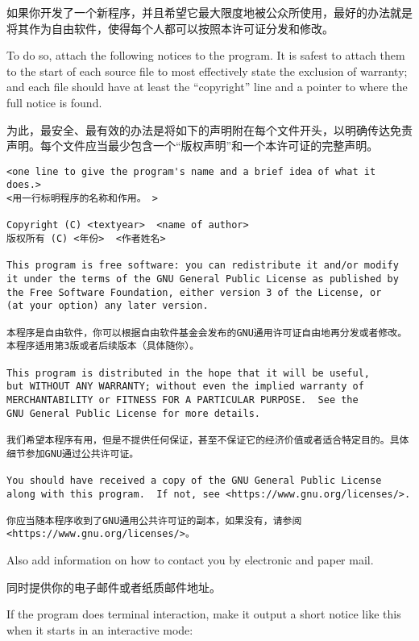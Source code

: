 \documentclass[11pt]{article}
\begin{document}
\begin{enumerate}
        如果你开发了一个新程序，并且希望它最大限度地被公众所使用，最好的办法就是将其作为自由软件，使得每个人都可以按照本许可证分发和修改。

        To do so, attach the following notices to the program.  It is safest
        to attach them to the start of each source file to most effectively
        state the exclusion of warranty; and each file should have at least
        the ``copyright'' line and a pointer to where the full notice is found.

        为此，最安全、最有效的办法是将如下的声明附在每个文件开头，以明确传达免责声明。每个文件应当最少包含一个“版权声明”和一个本许可证的完整声明。

          {\footnotesize
            \begin{verbatim}
<one line to give the program's name and a brief idea of what it does.>
<用一行标明程序的名称和作用。 >

Copyright (C) <textyear>  <name of author>
版权所有 (C) <年份>  <作者姓名>

This program is free software: you can redistribute it and/or modify
it under the terms of the GNU General Public License as published by
the Free Software Foundation, either version 3 of the License, or
(at your option) any later version.

本程序是自由软件，你可以根据自由软件基金会发布的GNU通用许可证自由地再分发或者修改。本程序适用第3版或者后续版本（具体随你）。

This program is distributed in the hope that it will be useful,
but WITHOUT ANY WARRANTY; without even the implied warranty of
MERCHANTABILITY or FITNESS FOR A PARTICULAR PURPOSE.  See the
GNU General Public License for more details.

我们希望本程序有用，但是不提供任何保证，甚至不保证它的经济价值或者适合特定目的。具体细节参加GNU通过公共许可证。

You should have received a copy of the GNU General Public License
along with this program.  If not, see <https://www.gnu.org/licenses/>.

你应当随本程序收到了GNU通用公共许可证的副本，如果没有，请参阅<https://www.gnu.org/licenses/>。
\end{verbatim}
          }

        Also add information on how to contact you by electronic and paper mail.

        同时提供你的电子邮件或者纸质邮件地址。

        If the program does terminal interaction, make it output a short
        notice like this when it starts in an interactive mode:


\end{enumerate}
\end{document}
